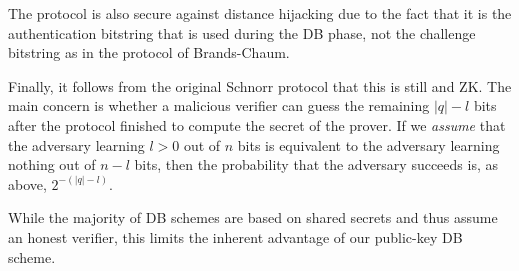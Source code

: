The protocol is also secure against distance hijacking due to the fact
that it is the authentication bitstring that is used during the \ac{DB}
phase, not the challenge bitstring as in the protocol of Brands-Chaum.

Finally, it follows from the original Schnorr protocol that this is still 
 and \ac{ZK}.
The main concern is whether a malicious verifier can guess the remaining 
\(|q|-l\) bits after the protocol finished to compute the secret of the prover.
If we \emph{assume} that the adversary learning \(l > 0\) out of \(n\) bits is 
equivalent to the adversary learning nothing out of \(n-l\) bits, then the 
probability that the adversary succeeds is, as above, \(2^{-(|q|-l)}\).

While the majority of \ac{DB} schemes are based on
shared secrets and thus assume an honest verifier, this limits the
inherent advantage of our public-key \ac{DB} scheme.


